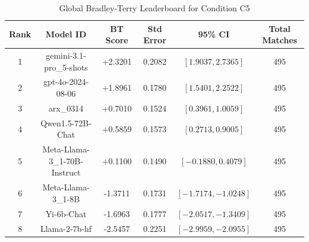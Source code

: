 \begin{table}[ht]
\centering
\caption{Global Bradley-Terry Leaderboard for Condition \textsc{C5}}
\label{tab:leaderboard_c5}
\begin{tabular}{cccccc}
\hline
\textbf{Rank} & \textbf{Model ID} & \textbf{BT Score} & \textbf{Std Error} & \textbf{95\% CI} & \textbf{Total Matches} \\
\hline
1 & gemini-3.1-pro\_5-shots & +2.3201 & 0.2082 & $[1.9037, 2.7365]$ & 495 \\
2 & gpt-4o-2024-08-06 & +1.8961 & 0.1780 & $[1.5401, 2.2522]$ & 495 \\
3 & arx\_0314 & +0.7010 & 0.1524 & $[0.3961, 1.0059]$ & 495 \\
4 & Qwen1.5-72B-Chat & +0.5859 & 0.1573 & $[0.2713, 0.9005]$ & 495 \\
5 & Meta-Llama-3\_1-70B-Instruct & +0.1100 & 0.1490 & $[-0.1880, 0.4079]$ & 495 \\
6 & Meta-Llama-3\_1-8B & -1.3711 & 0.1731 & $[-1.7174, -1.0248]$ & 495 \\
7 & Yi-6b-Chat & -1.6963 & 0.1777 & $[-2.0517, -1.3409]$ & 495 \\
8 & Llama-2-7b-hf & -2.5457 & 0.2251 & $[-2.9959, -2.0955]$ & 495 \\
\hline
\end{tabular}
\end{table}
